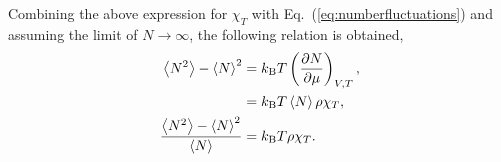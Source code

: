 \documentclass[a4paper]{article}
\begin{document}
Combining the above expression for $\chi_{T}$ with Eq.~(\ref{eq:numberfluctuations}) and assuming the limit of $N\rightarrow\infty$, the following relation is obtained,
\begin{equation}
\begin{split}
\left<N^{2}\right>-\left<N\right>^{2}&=k_{\rm B}T\left(\frac{\partial N}{\partial \mu}\right)_{V,T},\\
&=k_{\rm B}T\left<N\right> \rho\chi_{T},\\
\frac{\left<N^{2}\right>-\left<N\right>^{2}}{\left<N\right>}&=k_{\rm B}T\rho\chi_{T}.
\end{split}
\end{equation}
\end{document}
